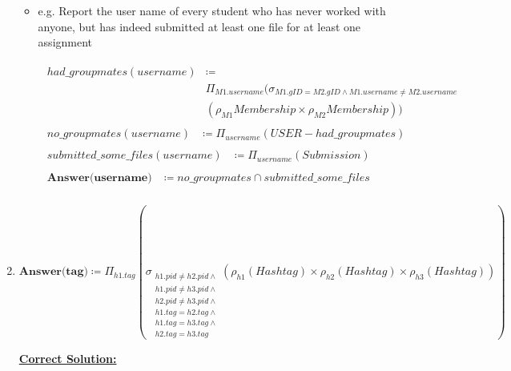 \documentclass[12pt]{article}
\begin{document}
\begin{enumerate}[1.]
\begin{itemize}
        \item e.g. Report the user name of every student who has never worked with
        anyone, but has indeed submitted at least one file for at least one assignment

        \bigskip

        \begin{align*}
            \begin{split}
            had\_groupmates(username) &\coloneqq\\
            &\Pi_{M1.username}(\sigma_{M1.gID=M2.gID \land M1.username \neq M2.username}\\
            &(\rho_{M1}Membership \times \rho_{M2}Membership))
            \end{split}\\[1em]
            \begin{split}
            no\_groupmates(username) &\coloneqq \Pi_{username}(USER - had\_groupmates)
            \end{split}\\[1em]
            \begin{split}
            submitted\_some\_files(username) &\coloneqq \Pi_{username}(Submission)
            \end{split}\\[1em]
            \begin{split}
            \textbf{Answer(username)} &\coloneqq no\_groupmates \cap submitted\_some\_files
        \end{split}\\
        \end{align*}
    \end{itemize}

    \item

    $\textbf{Answer(tag)} \coloneqq \Pi_{h1.tag}(\sigma_{\substack{h1.pid \neq h2.pid \land
    \\ h1.pid \neq h3.pid \land \\ h2.pid \neq h3.pid \land \\ h1.tag = h2.tag \land \\ h1.tag = h3.tag \land \\ h2.tag = h3.tag}} (\rho_{h1}(Hashtag) \times \rho_{h2}(Hashtag) \times \rho_{h3}(Hashtag)))$

    \bigskip

    \begin{mdframed}
        \underline{\textbf{Correct Solution:}}


\end{mdframed}
\end{enumerate}
\end{document}
